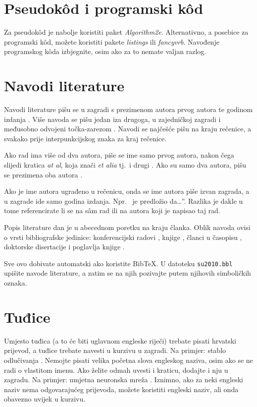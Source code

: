 \documentclass[10pt, a4paper]{article}
\begin{document}
\section{Pseudok\^od i programski k\^od}

Za pseudok\^od je nabolje koristiti paket \emph{Algorithm2e}.
Alternativno, a posebice za programski k\^od, možete koristiti pakete
\emph{listings} ili \emph{fancyvrb}. Navođenje programskog k\^oda
izbjegnite, osim ako za to nemate valjan razlog.

\section{Navodi literature}

Navodi literature pišu se u zagradi s prezimenom autora prvog autora
te godinom izdanja \citep{chomsky-73}.  Više navoda se pišu jedan iza
drugoga, u zajedničkoj zagradi i međusobno odvojeni točka-zarezom
\citep{chomsky-73,chave-64,feigl-58}. Navodi se najčešće pišu na kraju
rečenice, a svakako prije interpunkcijskog znaka za kraj rečenice.

Ako rad ima više od dva autora, piše se ime samo prvog autora, nakon
čega slijedi kratica \emph{at al}, koja znači \emph{et alia} tj.~i
drugi \citep{johnson-etc}. Ako su samo dva autora, pišu se prezimena
oba autora \citep{johnson-howells}.

Ako je ime autora ugrađeno u rečenicu, onda se ime autora piše izvan
zagrada, a u zagrade ide samo godina izdanja.  Npr.~\citet{chomsky-73}
je predložio da\dots''. Razlika je dakle u tome referencirate li se na
s\^am rad ili na autora koji je napisao taj rad.

Popis literature dan je u abecednom poretku na kraju članka.  Oblik
navoda ovisi o vrsti bibliografske jedinice: konferencijski radovi
\citep{chave-64}, knjige \citep{butcher-81}, članci u časopisu
\citep{howells-51}, doktorske disertacije \citep{croft-78} i poglavlja
knjige \citep{feigl-58}. 

Sve ovo dobivate automatski ako koristite BibTeX. U datoteku
\texttt{su2010.bbl} upišite navode literature, a zatim se na njih
pozivajte putem njihovih simboličkih oznaka.

\section{Tuđice}

Umjesto tuđica (a to će biti uglavnom engleske riječi) trebate pisati
hrvatski prijevod, a tuđice trebate navesti u kurzivu u zagradi. Na
primjer: stablo odlučivanja . Nemojte pisati
velika početna slova engleskog naziva, osim ako se ne radi o vlastitom
imenu. Ako želite odmah uvesti i kraticu, dodajte i nju u zagradu. Na
primjer: umjetna neuronska mreža . Iznimno, ako za neki engleski naziv nema odgovarajućeg
prijevoda, možete koristiti engleski naziv, ali onda obavezno uvijek u
kurzivu.
\end{document}

